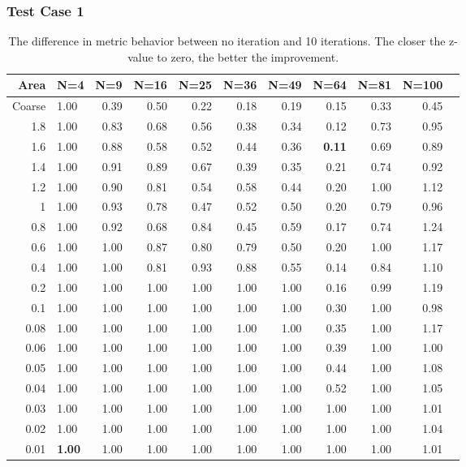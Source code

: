 \documentclass[]{beamer}
\begin{document}
\begin{frame}\frametitle{Test Case 1}
\begin{table}[H]
\tiny
\centering
\caption{The difference in metric behavior between no iteration and 10 iterations. The closer the z-value to zero, the better the improvement.} 
\begin{tabular}{rlrrrrrrrrr}
  \hline
 Area & N=4 & N=9 & N=16 & N=25 & N=36 & N=49 & N=64 & N=81 & N=100 \\ 
  \hline
 Coarse & 1.00 & 0.39 & 0.50 & 0.22 & 0.18 & 0.19 & 0.15 & 0.33 & 0.45 \\ 
   1.8 & 1.00 & 0.83 & 0.68 & 0.56 & 0.38 & 0.34 & 0.12 & 0.73 & 0.95 \\ 
   1.6 & 1.00 & 0.88 & 0.58 & 0.52 & 0.44 & 0.36 & \textbf{\cellcolor{blue!25}0.11} & 0.69 & 0.89 \\ 
  1.4 & 1.00 & 0.91 & 0.89 & 0.67 & 0.39 & 0.35 & 0.21 & 0.74 & 0.92 \\ 
   1.2 & 1.00 & 0.90 & 0.81 & 0.54 & 0.58 & 0.44 & 0.20 & 1.00 & 1.12 \\ 
   1 & 1.00 & 0.93 & 0.78 & 0.47 & 0.52 & 0.50 & 0.20 & 0.79 & 0.96 \\ 
0.8 & 1.00 & 0.92 & 0.68 & 0.84 & 0.45 & 0.59 & 0.17 & 0.74 & 1.24 \\ 
  0.6 & 1.00 & 1.00 & 0.87 & 0.80 & 0.79 & 0.50 & 0.20 & 1.00 & 1.17 \\ 
 0.4 & 1.00 & 1.00 & 0.81 & 0.93 & 0.88 & 0.55 & 0.14 & 0.84 & 1.10 \\ 
  0.2 & 1.00 & 1.00 & 1.00 & 1.00 & 1.00 & 1.00 & 0.16 & 0.99 & 1.19 \\ 
  0.1 & 1.00 & 1.00 & 1.00 & 1.00 & 1.00 & 1.00 & 0.30 & 1.00 & 0.98 \\ 
   0.08 & 1.00 & 1.00 & 1.00 & 1.00 & 1.00 & 1.00 & 0.35 & 1.00 & 1.17 \\ 
   0.06 & 1.00 & 1.00 & 1.00 & 1.00 & 1.00 & 1.00 & 0.39 & 1.00 & 1.00 \\ 
   0.05 & 1.00 & 1.00 & 1.00 & 1.00 & 1.00 & 1.00 & 0.44 & 1.00 & 1.08 \\ 
   0.04 & 1.00 & 1.00 & 1.00 & 1.00 & 1.00 & 1.00 & 0.52 & 1.00 & 1.05 \\ 
   0.03 & 1.00 & 1.00 & 1.00 & 1.00 & 1.00 & 1.00 & 1.00 & 1.00 & 1.01 \\ 
  0.02 & 1.00 & 1.00 & 1.00 & 1.00 & 1.00 & 1.00 & 1.00 & 1.00 & 1.04 \\ 
   0.01 & \textbf{\cellcolor{blue!25}1.00} & 1.00 & 1.00 & 1.00 & 1.00 & 1.00 & 1.00 & 1.00 & 1.01 \\ 
   \hline
\end{tabular}
\end{table}
\end{frame}
\end{document}
